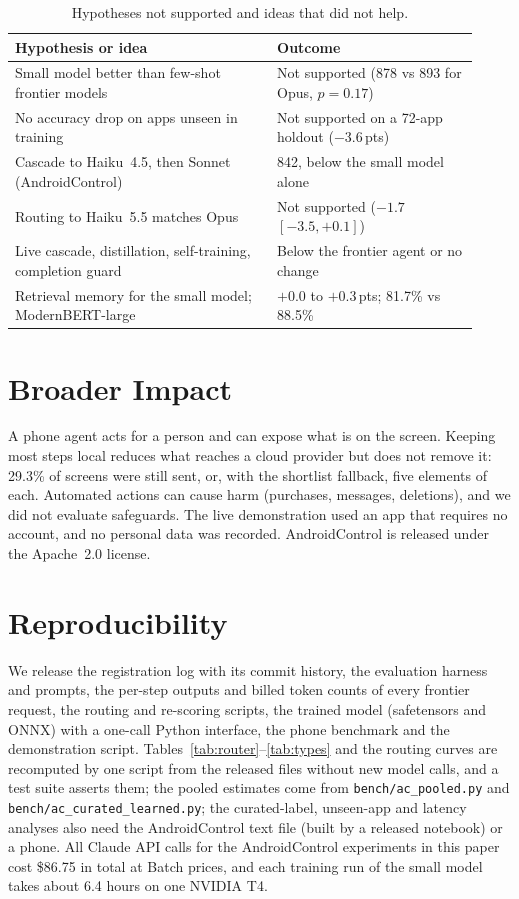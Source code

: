 \documentclass[10pt]{article}
\newcommand{\pts}{\,pts}
\begin{document}
\begin{table}[t]\centering\small
\caption{Hypotheses not supported and ideas that did not help.}\label{tab:neg}
\begin{tabular}{p{0.52\linewidth}p{0.4\linewidth}}\toprule
Hypothesis or idea & Outcome\\\midrule
Small model better than few-shot frontier models & Not supported (878 vs 893 for Opus, $p=0.17$)\\
No accuracy drop on apps unseen in training & Not supported on a 72-app holdout ($-3.6$\pts)\\
Cascade to Haiku~4.5, then Sonnet (AndroidControl) & 842, below the small model alone\\
Routing to Haiku~5.5 matches Opus & Not supported ($-1.7$ $[-3.5, +0.1]$)\\
Live cascade, distillation, self-training, completion guard & Below the frontier agent or no change\\
Retrieval memory for the small model; ModernBERT-large & $+0.0$ to $+0.3$\pts; 81.7\% vs 88.5\%\\\bottomrule
\end{tabular}\end{table}

\section*{Broader Impact}
A phone agent acts for a person and can expose what is on the screen. Keeping most steps local reduces what reaches a cloud provider but does not remove it: 29.3\% of screens were still sent, or, with the shortlist fallback, five elements of each. Automated actions can cause harm (purchases, messages, deletions), and we did not evaluate safeguards. The live demonstration used an app that requires no account, and no personal data was recorded. AndroidControl is released under the Apache~2.0 license.

\section*{Reproducibility}
We release the registration log with its commit history, the evaluation harness and prompts, the per-step outputs and billed token counts of every frontier request, the routing and re-scoring scripts, the trained model (safetensors and ONNX) with a one-call Python interface, the phone benchmark and the demonstration script. Tables~\ref{tab:router}--\ref{tab:types} and the routing curves are recomputed by one script from the released files without new model calls, and a test suite asserts them; the pooled estimates come from \texttt{bench/ac\_pooled.py} and \texttt{bench/ac\_curated\_learned.py}; the curated-label, unseen-app and latency analyses also need the AndroidControl text file (built by a released notebook) or a phone. All Claude API calls for the AndroidControl experiments in this paper cost \$86.75 in total at Batch prices, and each training run of the small model takes about 6.4 hours on one NVIDIA T4.
\end{document}
